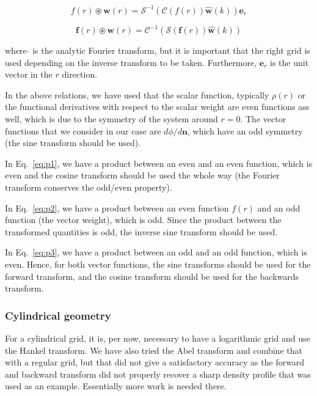 \documentclass[12pt, letterpaper]{article}
\begin{document}
\begin{equation}
  f(r)\circledast \mathbf{w}(r) = \mathscr{S}^{-1}\left(\mathscr{C}\left(f(r)\right)\hat{\mathbf{w}}(k)\right)\mathbf{e}_r
   \label{eq:p2}
\end{equation}

\begin{equation}
  \mathbf{f}(r)\circledast \mathbf{w}(r) = \mathscr{C}^{-1}\left(\mathscr{S}\left(\mathbf{f}(r)\right)\hat{\mathbf{w}}(k)\right)
   \label{eq:p3}
\end{equation}

where $\hat{}$ is the analytic Fourier transform, but it is important that the right grid is used depending on the inverse transform to be taken. Furthermore, $\mathbf{e}_r$ is the unit vector in the $r$ direction.

In the above relations, we have used that the scalar function, typically $\rho(r)$ or the functional derivatives with respect to the scalar weight are even functions ass well, which is due to the symmetry of the system around $r=0$. The vector functions that we consider in our case are $d\phi/d\mathbf{n}$, which have an odd symmetry (the sine transform should be used).

In Eq.~\ref{eq:p1}, we have a product between an even and an even function, which is even and the cosine transform should be used the whole way (the Fourier transform conserves the odd/even property).

In Eq.~\ref{eq:p2}, we have a product between an even function $f(r)$ and an odd function (the vector weight), which is odd. Since the product between the transformed quantities is odd, the inverse sine transform should be used.

In Eq.~\ref{eq:p3}, we have a product between an odd and an odd function, which is even. Hence, for both vector functions, the sine transforms should be used for the forward transform, and the cosine transform should be used for the backwards transform.

\subsubsection{Cylindrical geometry}
For a cylindrical grid, it is, per now, necessary to have a logarithmic grid and use the Hankel transform. We have also tried the Abel transform and combine that with a regular grid, but that did not give a satisfactory accuracy as the forward and backward transform did not properly recover a sharp density profile that was used as an example. Essentially more work is needed there.
\end{document}

